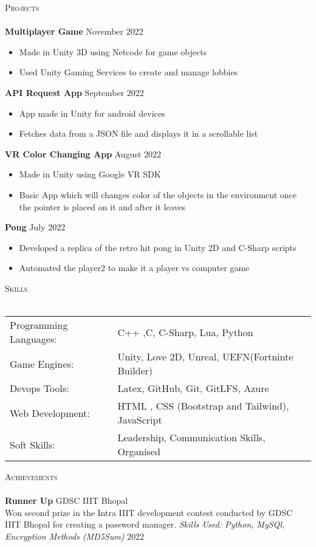 \documentclass[a4paper]{article}
\newcommand{\lineunder} {
    \vspace*{-8pt} \\
    \hspace*{-18pt} \hrulefill \\
}
\newcommand{\header} [1] {
    {\hspace*{-18pt}\vspace*{6pt} \textsc{#1}}
    \vspace*{-6pt} \lineunder
}
\begin{document}
\header{Projects}
{\textbf{Multiplayer Game}} \hfill November 2022
\vspace{-2.5mm}
\begin{itemize} 
	\item Made in Unity 3D using Netcode for game objects
  \vspace{-2.5mm}
        \item Used Unity Gaming Services to create and manage lobbies 
\end{itemize}
{\textbf{API Request App}} \hfill September 2022
\vspace{-2.5mm}
\begin{itemize} 
	\item App made in Unity for android devices
  \vspace{-2.5mm}
        \item Fetches data from a JSON file and displays it in a scrollable list
\end{itemize}
{\textbf{VR Color Changing App}} \hfill August 2022
\vspace{-2.5mm}
\begin{itemize} 
	\item Made in Unity using Google VR SDK
  \vspace{-2.5mm}
        \item Basic App which will changes color of the objects in the environment once the pointer is placed on it and after it leaves
\end{itemize}
{\textbf{Pong}} \hfill July 2022
\vspace{-2.5mm}
\begin{itemize} 
	\item Developed a replica of the retro hit pong in Unity 2D and C-Sharp scripts
  \vspace{-2.5mm}
        \item Automated the player2 to make it a player vs computer game 
\end{itemize}
\header{Skills}
\vspace{2mm}
\begin{tabular}{ l l }
	Programming Languages: & C++ ,C, C-Sharp, Lua, Python \\
	Game Engines:& Unity, Love 2D, Unreal, UEFN(Fortninte Builder)  \\
        Devops Tools:        & Latex, GitHub, Git, GitLFS, Azure \\  
	Web Development:       & HTML , CSS (Bootstrap and Tailwind), JavaScript   \\
	Soft Skills:           &  Leadership, Communication Skills, Organised  \\
\end{tabular}

\vspace{2mm}
\header{Achievements}
\textbf{Runner Up} \hfill GDSC IIIT Bhopal\\
Won second prize in the Intra IIIT development contest conducted by GDSC IIIT Bhopal for creating a password manager.  
{\textit {Skills Used: Python, MySQl, Encryption Methods (MD5Sum)}}  \hfill 2022\\
\end{document}
